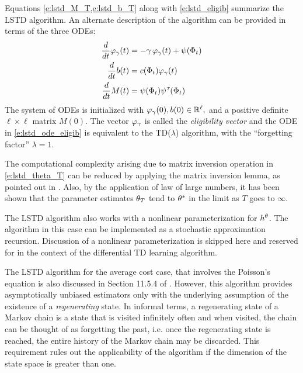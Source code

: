 Equations \cref{e:lstd_M_T,e:lstd_b_T} along with \eqref{e:lstd_eligib} summarize the LSTD algorithm. An alternate description of the algorithm can be provided in terms of the three ODEs:
\begin{subequations}
\begin{align}
\ddt \eligibvector_\discount (t) &= - \discount\, \eligibvector_\discount(t) + \basis (\markovstate_t) 
\label{e:lstd_ode_eligib} \\
\ddt b(t) &=  c(\markovstate_t)\eligibvector_\discount(t)
 \label{e:lstd_ode_b}\\
\ddt M(t) &= \basis(\markovstate_t) \basis^\transpose(\markovstate_t) 
\label{e:lstd_ode_M}
\end{align}
\end{subequations}
The system of ODEs is initialized with $\varphi_\gamma(0), b(0) \in \mathbb{R}^\ell,$ and a positive definite $\ell \times \ell$ matrix $M(0)$. The vector $\varphi_\gamma$ is called the \textit{eligibility vector} and  the ODE in \eqref{e:lstd_ode_eligib} is equivalent to the TD($\lambda$) algorithm, with the ``forgetting factor'' $\lambda = 1$. 

The computational complexity arising due to matrix inversion operation in \eqref{e:lstd_theta_T} can be reduced by applying the matrix inversion lemma, as pointed out in \cite{ctcn}. Also, by the application of law of large numbers, it has been shown that the parameter estimates $\theta_T$ tend to $\theta^*$ in the limit as $T$ goes to $\infty$. 

The LSTD algorithm also works with a nonlinear parameterization for $h^\theta$. The algorithm in this case can be implemented as a stochastic approximation recursion. Discussion of a nonlinear parameterization is skipped here and reserved for  in the context of the differential TD learning algorithm. 

The LSTD algorithm for the average cost case, that involves the Poisson's equation is also discussed in Section 11.5.4 of \cite{ctcn}. However, this algorithm provides asymptotically unbiased estimators only with the underlying assumption of the existence of a \textit{regenerating} state. In informal terms, a regenerating state of a Markov chain is a state that is visited infinitely often and when visited, the chain can be thought of as forgetting the past, i.e. once the regenerating state is reached, the entire history of the Markov chain may be discarded. This requirement rules out the applicability of the algorithm if the dimension of the state space is greater than one. 

